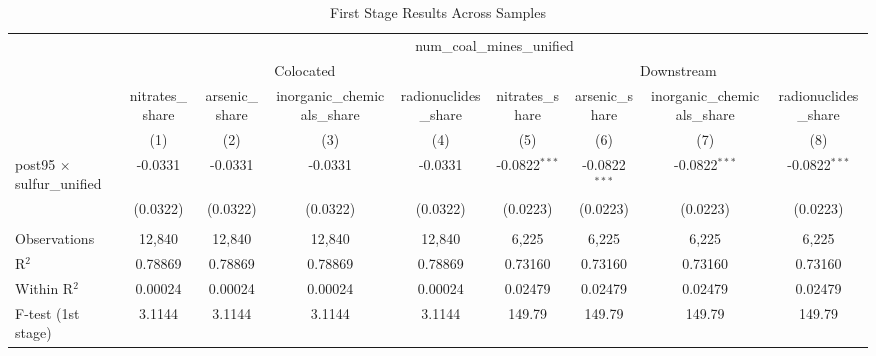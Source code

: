 
\begin{table}[htbp]
   \caption{\label{tab:first_stages} First Stage Results Across Samples}
   \bigskip
   \centering
   \begin{adjustbox}{width = \textwidth, center}
      \begin{tabular}{lcccccccc}
         \toprule
          & \multicolumn{8}{c}{num\_coal\_mines\_unified}\\
          & \multicolumn{4}{c}{Colocated} & \multicolumn{4}{c}{Downstream} \\ 
                                           & nitrates\_share  & arsenic\_share  & inorganic\_chemicals\_share   & radionuclides\_share  & nitrates\_share  & arsenic\_share  & inorganic\_chemicals\_share   & radionuclides\_share \\    
                                           & (1)              & (2)             & (3)                           & (4)                   & (5)              & (6)             & (7)                           & (8)\\  
         \midrule 
         post95 $\times$ sulfur\_unified   & -0.0331          & -0.0331         & -0.0331                       & -0.0331               & -0.0822$^{***}$  & -0.0822$^{***}$ & -0.0822$^{***}$               & -0.0822$^{***}$\\   
                                           & (0.0322)         & (0.0322)        & (0.0322)                      & (0.0322)              & (0.0223)         & (0.0223)        & (0.0223)                      & (0.0223)\\   
          \\
         Observations                      & 12,840           & 12,840          & 12,840                        & 12,840                & 6,225            & 6,225           & 6,225                         & 6,225\\  
         R$^2$                             & 0.78869          & 0.78869         & 0.78869                       & 0.78869               & 0.73160          & 0.73160         & 0.73160                       & 0.73160\\  
         Within R$^2$                      & 0.00024          & 0.00024         & 0.00024                       & 0.00024               & 0.02479          & 0.02479         & 0.02479                       & 0.02479\\  
         F-test (1st stage)                & 3.1144           & 3.1144          & 3.1144                        & 3.1144                & 149.79           & 149.79          & 149.79                        & 149.79\\  

\end{tabular}
\end{adjustbox}
\end{table}
